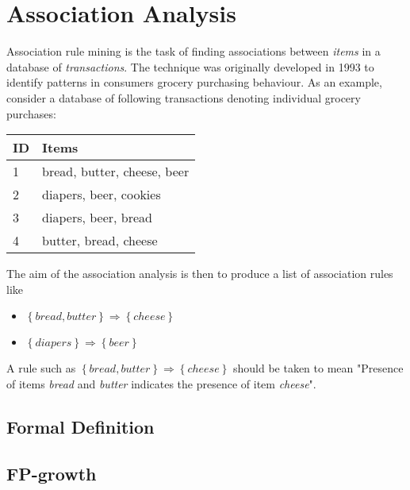 \section{Association Analysis}

Association rule mining is the task of finding associations between \textit{items} in a database of \textit{transactions}. The technique was originally developed in 1993 to identify patterns in consumers grocery purchasing behaviour. As an example, consider a database of following transactions denoting individual grocery purchases:
 
\begin{center}
    \begin{tabular}{ | l | l | }
    \hline
    \textbf{ID} & \textbf{Items} \\ \hline
    1 & bread, butter, cheese, beer \\ \hline 
    2 & diapers, beer, cookies \\ \hline 
    3 & diapers, beer, bread \\ \hline 
    4 & butter, bread, cheese \\ \hline 
    \end{tabular}
\end{center} 
 
The aim of the association analysis is then to produce a list of association rules like 

\begin{itemize}
	\item $\left\{ bread, butter \right\} \Rightarrow \left\{ cheese \right\}$	
	\item $\left\{ diapers \right\} \Rightarrow \left\{ beer \right\}$	
\end{itemize} 

A rule such as $\left\{ bread, butter \right\} \Rightarrow \left\{ cheese \right\}$	should be taken to mean "Presence of items \textit{bread} and \textit{butter} indicates the presence of item \textit{cheese}". 

\subsection{Formal Definition}


\subsection{FP-growth}